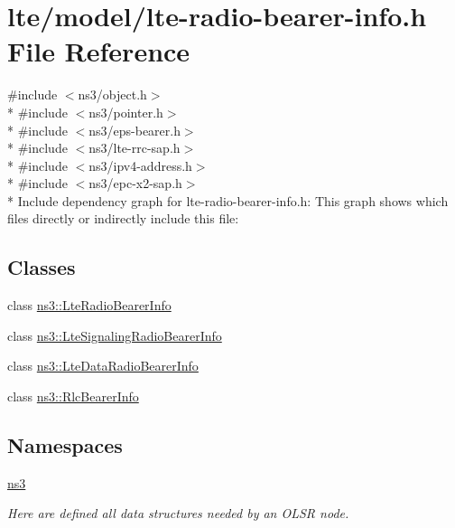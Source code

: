 \hypertarget{lte-radio-bearer-info_8h}{}\section{lte/model/lte-\/radio-\/bearer-\/info.h File Reference}
\label{lte-radio-bearer-info_8h}
{\ttfamily \#include $<$ns3/object.\+h$>$}\\*
{\ttfamily \#include $<$ns3/pointer.\+h$>$}\\*
{\ttfamily \#include $<$ns3/eps-\/bearer.\+h$>$}\\*
{\ttfamily \#include $<$ns3/lte-\/rrc-\/sap.\+h$>$}\\*
{\ttfamily \#include $<$ns3/ipv4-\/address.\+h$>$}\\*
{\ttfamily \#include $<$ns3/epc-\/x2-\/sap.\+h$>$}\\*
Include dependency graph for lte-\/radio-\/bearer-\/info.h\+:
This graph shows which files directly or indirectly include this file\+:
\subsection*{Classes}
\begin{DoxyCompactItemize}
\item 
class \hyperlink{classns3_1_1LteRadioBearerInfo}{ns3\+::\+Lte\+Radio\+Bearer\+Info}
\item 
class \hyperlink{classns3_1_1LteSignalingRadioBearerInfo}{ns3\+::\+Lte\+Signaling\+Radio\+Bearer\+Info}
\item 
class \hyperlink{classns3_1_1LteDataRadioBearerInfo}{ns3\+::\+Lte\+Data\+Radio\+Bearer\+Info}
\item 
class \hyperlink{classns3_1_1RlcBearerInfo}{ns3\+::\+Rlc\+Bearer\+Info}
\end{DoxyCompactItemize}
\subsection*{Namespaces}
\begin{DoxyCompactItemize}
\item 
 \hyperlink{namespacens3}{ns3}
\begin{DoxyCompactList}\small\item\em Here are defined all data structures needed by an O\+L\+SR node. \end{DoxyCompactList}\end{DoxyCompactItemize}
